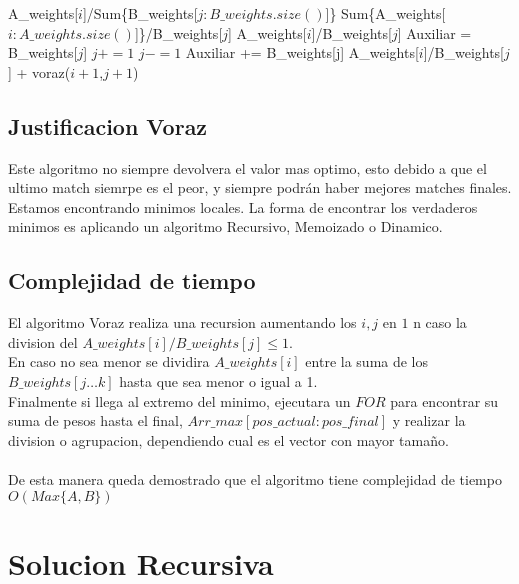 \documentclass[12pt]{article}
\newcommand{\TITLE}[1]{\item[#1]}
\begin{document}
\par\null\par

\begin{algorithmic}[1]
		\TITLE{\textsc{voraz}$(i,j)$}
  \RETURN A\_weights[$i$]/Sum\{B\_weights[$j:B\_weights.size()$]\}
  \ENDIF
  \RETURN Sum\{A\_weights[$i:A\_weights.size()$]\}/B\_weights[$j$]
  \ENDIF
  \RETURN A\_weights[$i$]/B\_weights[$j$]
  \ENDIF
  \STATE Auxiliar = B\_weights[$j$]
  \STATE $j+=1$
  \STATE $j-=1$
  \BREAK
  \ENDIF
  \STATE Auxiliar += B\_weights[j]
  \ENDWHILE
  \RETURN A\_weights[$i$]/B\_weights[$j$] + voraz($i+1$,$j+1$)

 \end{algorithmic}
 \subsection{Justificacion Voraz}
 Este algoritmo no siempre devolvera el valor mas optimo, esto debido a que el ultimo match siemrpe es el peor, y siempre podrán haber mejores matches finales. Estamos encontrando minimos locales. La forma de encontrar los verdaderos minimos es aplicando un algoritmo Recursivo, Memoizado o Dinamico.

 \subsection{Complejidad de tiempo}

 El algoritmo Voraz realiza una recursion aumentando los $i,j$ en $1$ n caso la division del $A\_weights[i]/B\_weights[j] \leq 1$.\\
 En caso no sea menor se dividira $A\_weights[i]$ entre la suma de los $B\_weights[j \dots k]$ hasta que sea menor o igual a 1.\\
 Finalmente si llega al extremo del minimo, ejecutara un $FOR$ para encontrar su suma de pesos hasta el final, $Arr\_max[pos\_actual : pos\_final]$ y realizar la division o agrupacion, dependiendo cual es el vector con mayor tamaño.\\ \\
 De esta manera queda demostrado que el algoritmo tiene complejidad de tiempo $O(Max\{A,B\})$


\newpage
\section{Solucion Recursiva}
\end{document}

